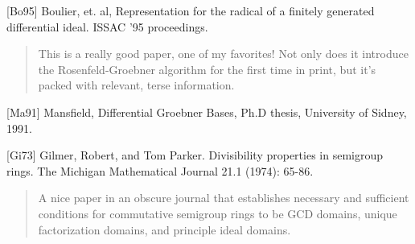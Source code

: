\documentclass{article}
\begin{document}
[Bo95] Boulier, et. al, Representation for the radical of a finitely
generated differential ideal.  ISSAC '95 proceedings.

\begin{quote}
This is a really good paper, one of my favorites!  Not only does it
introduce the Rosenfeld-Groebner algorithm for the first time in
print, but it's packed with relevant, terse information.
\end{quote}

[Ma91] Mansfield, Differential Groebner Bases, Ph.D thesis, University
of Sidney, 1991.

[Gi73] Gilmer, Robert, and Tom Parker.  Divisibility properties in semigroup rings.
The Michigan Mathematical Journal 21.1 (1974): 65-86.

\begin{quote}
  A nice paper in an obscure journal that establishes necessary and
  sufficient conditions for commutative semigroup rings to be GCD
  domains, unique factorization domains, and principle ideal domains.
\end{quote}
\end{document}
